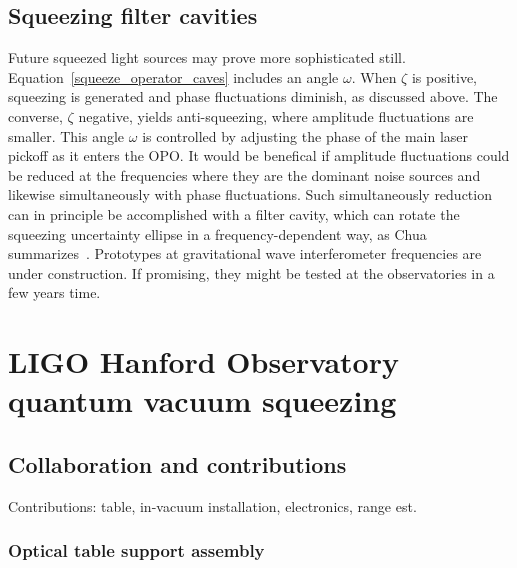 
        \subsection{Squeezing filter cavities}
        \label{third-gen_squeezing}

Future squeezed light sources may prove more sophisticated still.
Equation~\ref{squeeze_operator_caves} includes an angle $\omega$. When $\zeta$ is positive, squeezing is generated and phase fluctuations diminish, as discussed above. 
The converse, $\zeta$ negative, yields anti-squeezing, where amplitude fluctuations are smaller. 
This angle $\omega$ is controlled by adjusting the phase of the main laser pickoff as it enters the OPO.
It would be benefical if amplitude fluctuations could be reduced at the frequencies where they are the dominant noise sources and likewise simultaneously with phase fluctuations. 
Such simultaneously reduction can in principle be accomplished with a filter cavity, which can rotate the squeezing uncertainty ellipse in a frequency-dependent way, as Chua summarizes~\cite{ChuaThesis}.
Prototypes at gravitational wave interferometer frequencies are under construction.
If promising, they might be tested at the observatories in a few years time.

    \section{LIGO Hanford Observatory quantum vacuum squeezing}
    \label{LHO_squeeze}


        \subsection{Collaboration and contributions}
        \label{contributions}

            Contributions: table, in-vacuum installation, electronics, range est.

            \subsubsection{Optical table support assembly}
            \label{table_legs}

